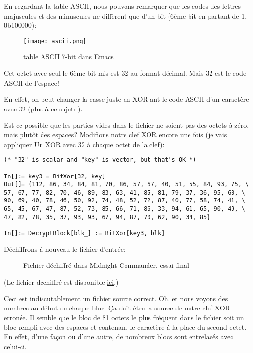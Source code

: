 En regardant la table ASCII, nous pouvons remarquer que les codes des lettres majuscules
et des minuscules ne diffèrent que d'un bit (6ème bit en partant de 1, 0b100000):

\begin{figure}[H]
\centering
\texttt{[image: ascii.png]}
\caption{table \ac{ASCII} 7-bit dans Emacs}
\end{figure}

Cet octet avec seul le 6ème bit mis est 32 au format décimal.
Mais 32 est le code ASCII de l'espace!

En effet, on peut changer la casse juste en XOR-ant le code ASCII d'un caractère
avec 32 (plus à ce sujet: ).

Est-ce possible que les parties vides dans le fichier ne soient pas des octets à zéro,
mais plutôt des espaces?
Modifions notre clef XOR encore une fois (je vais appliquer Un XOR avec 32 à chaque
octet de la clef):

\begin{lstlisting}[style=custommath]
(* "32" is scalar and "key" is vector, but that's OK *)

In[]:= key3 = BitXor[32, key]
Out[]= {112, 86, 34, 84, 81, 70, 86, 57, 67, 40, 51, 55, 84, 93, 75, \
57, 67, 77, 82, 70, 46, 89, 83, 63, 41, 85, 81, 79, 37, 36, 95, 60, \
90, 69, 40, 78, 46, 50, 92, 74, 48, 52, 72, 87, 40, 77, 58, 74, 41, \
65, 45, 67, 47, 87, 52, 73, 85, 66, 71, 86, 33, 94, 61, 65, 90, 49, \
47, 82, 78, 35, 37, 93, 93, 67, 94, 87, 70, 62, 90, 34, 85}

In[]:= DecryptBlock[blk_] := BitXor[key3, blk]
\end{lstlisting}

Déchiffrons à nouveau le fichier d'entrée:

\begin{figure}[H]
\centering
{}
\caption{Fichier déchiffré dans Midnight Commander, essai final}
\end{figure}

(Le fichier déchiffré est disponible
\href{\GitHubBlobMasterURL/ff/XOR/mask_1/files/decrypted.dat.bz2}{ici}.)

Ceci est indiscutablement un fichier source correct.
Oh, et nous voyons des nombres au début de chaque bloc. Ça doit être la source de
notre clef XOR erronée.
Il semble que le bloc de 81 octets le plus fréquent dans le fichier soit un bloc
rempli avec des espaces et contenant le caractère  à la place du second octet.
En effet, d'une façon ou d'une autre, de nombreux blocs sont entrelacés avec celui-ci.

